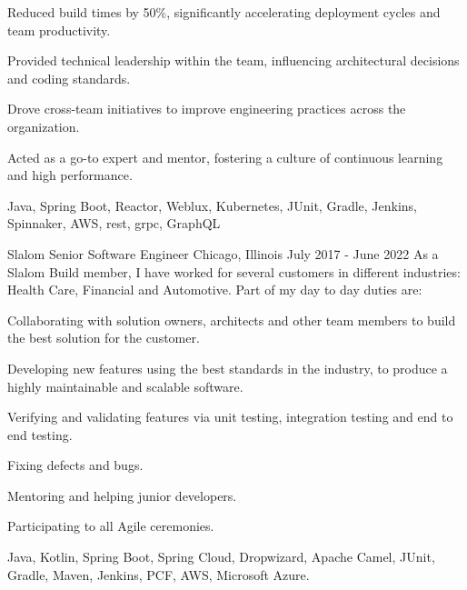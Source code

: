 \begin{cventries}
{\begin{cvitems}
		\item {Reduced build times by 50\%, significantly accelerating deployment cycles and team productivity.}
		\item {Provided technical leadership within the team, influencing architectural decisions and coding standards.}
		\item {Drove cross-team initiatives to improve engineering practices across the organization.}
		\item {Acted as a go-to expert and mentor, fostering a culture of continuous learning and high performance.}
      \end{cvitems}
    }
    {Java, Spring Boot, Reactor, Weblux, Kubernetes, JUnit, Gradle, Jenkins, Spinnaker, AWS, rest, grpc, GraphQL}

  \experienceentry
  {Slalom} %
    {Senior Software Engineer} %
    {Chicago, Illinois} %
    {July 2017 - June 2022} %
    {As a Slalom Build member, I have worked for several customers in different industries: Health Care, Financial and Automotive. Part of my day to day duties are:}
    {
      \begin{cvitems} %
      	\item {Collaborating with solution owners, architects and other team members to build the best solution for the customer.}
      	\item {Developing new features using the best standards in the industry, to produce a highly maintainable and scalable software.}
      	\item {Verifying and validating features via unit testing, integration testing and end to end testing.}
      	\item {Fixing defects and bugs.}
      	\item {Mentoring and helping junior developers.}
        \item {Participating to all Agile ceremonies.}
      \end{cvitems}
    }
    {Java, Kotlin, Spring Boot, Spring Cloud, Dropwizard, Apache Camel, JUnit, Gradle, Maven, Jenkins, PCF, AWS, Microsoft Azure.}
  

\end{cventries}
